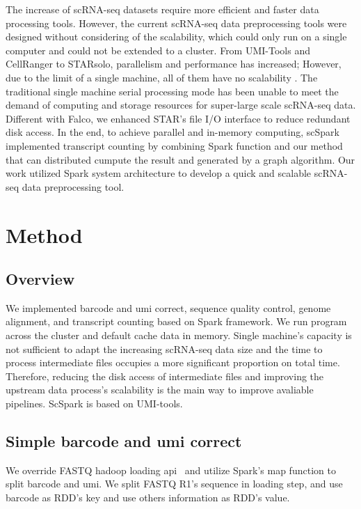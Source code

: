 \documentclass[10pt,journal,compsoc]{IEEEtran}
\begin{document}
The increase of scRNA-seq datasets require more efficient and faster data processing tools. However, the current scRNA-seq data preprocessing tools were designed without considering of the scalability, which could only run on a single computer and could not be extended to a cluster. From UMI-Tools and CellRanger to STARsolo, parallelism and performance has increased; However, due to the limit of a single machine, all of them have no scalability . 
The traditional single machine serial processing mode has been unable to meet the demand of computing and storage resources for super-large scale scRNA-seq data.
Different with Falco, we enhanced STAR's file I/O interface to reduce redundant disk access.
In the end, to achieve parallel and in-memory computing, scSpark implemented transcript counting by combining Spark function and our method that can distributed cumpute the result and generated by a graph algorithm.
Our work utilized Spark system architecture to develop a quick and scalable scRNA-seq data preprocessing tool. 

\section{Method}
\subsection{Overview}
We implemented barcode and umi correct, sequence quality control, genome alignment, and transcript counting based on Spark framework. 
We run program across the cluster and default cache data in memory. 
Single machine's capacity is not sufficient to adapt the increasing scRNA-seq data size and the time to process intermediate files occupies a more significant proportion on total time. 
Therefore, reducing the disk access of intermediate files and improving the upstream data process's scalability is the main way to improve avaliable pipelines. 
ScSpark is based on UMI-tools.

\subsection{Simple barcode and umi correct}
We override FASTQ hadoop loading api~\cite{ref_url9} and utilize Spark's map function to split barcode and umi.
We split FASTQ R1's sequence in loading step, and use barcode as RDD's key and use others information as RDD's value.
\end{document}
